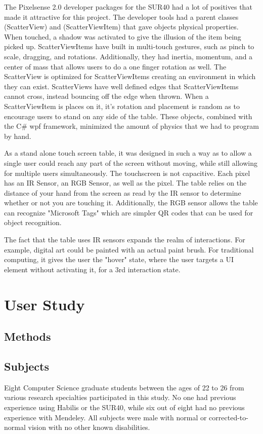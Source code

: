 \documentclass{article}
\begin{document}
The Pixelsense 2.0 developer packages for the SUR40 had a lot of positives that made it attractive for this project.    The developer tools had a parent classes (ScatterView) and (ScatterViewItem) that gave objects physical properties.  When touched, a shadow was activated to give the illusion of the item being picked up.  ScatterViewItems have built in multi-touch gestures, such as pinch to scale, dragging, and rotations. Additionally, they had inertia, momentum, and a center of mass that allows users to do a one finger rotation as well.  The ScatterView is optimized for ScatterViewItems creating an environment in which they can exist.  ScatterViews have well defined edges that ScatterViewItems cannot cross, instead bouncing off the edge when thrown.  When a ScatterViewItem is places on it, it's rotation and placement is random as to encourage users to stand on any side of the table.  These objects, combined with the C\# wpf framework, minimized the amount of physics that we had to program by hand.

As a stand alone touch screen table, it was designed in such a way as to allow a single user could reach any part of the screen without moving, while still allowing for multiple users simultaneously.  The touchscreen is not capacitive.  Each pixel has an IR Sensor, an RGB Sensor, as well as the pixel.  The table relies on the distance of your hand from the screen as read by the IR sensor to determine whether or not you are touching it.  Additionally, the RGB sensor allows the table can recognize "Microsoft Tags" which are simpler QR codes that can be used for object recognition.  

The fact that the table uses IR sensors expands the realm of interactions.  For example, digital art could be painted with an actual paint brush.  For traditional computing, it gives the user the "hover" state, where the user targets a UI element without activating it, for a 3rd interaction state.  

\section{User Study}
\subsection{Methods}
\subsection*{Subjects}
	Eight Computer Science graduate students between the ages of 22 to 26 from various research specialties participated in this study.  No one had previous experience using Habilis or the SUR40, while six out of eight had no previous experience with Mendeley. All subjects were male with  normal or corrected-to-normal vision with no other known disabilities. 
\end{document}
